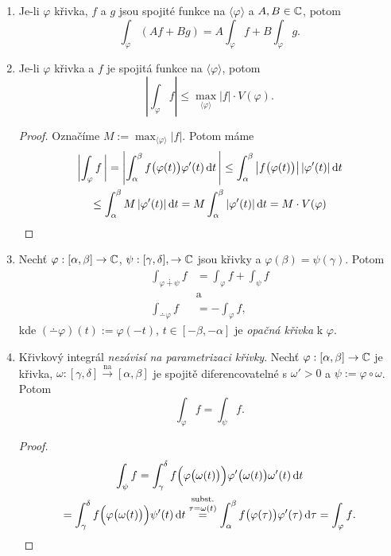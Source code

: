 \begin{propertiesBasic}
\mbox{}
\vspace{-2em}
\begin{enumerate}
    \item Je-li $\varphi$ křivka, $f$ a $g$ jsou spojité funkce na $\langle\varphi\rangle$ a $A,B \in \operatorname{\mathbb{C}}  $, potom $$\int_\varphi (Af+Bg)=A\int_\varphi f+B\int_\varphi g.$$
    \item Je-li $\varphi$ křivka a $f$ je spojitá funkce na $\langle\varphi\rangle$, potom $$\left|\int_\varphi f\right|\leq\max_{\langle\varphi\rangle}|f|\cdot V(\varphi).$$
    \begin{proof}
     Označíme $M:=\max_{\langle\varphi\rangle}|f|$. Potom máme
     \begin{multline*}
     \left|\int_\varphi f\, \right|=
     \left| \int_\alpha^\beta f\bigl(\varphi(t)\bigr) \varphi'(t) \mathop{}\!\mathrm{d} t \, \right|
     \leq\int_\alpha^\beta\left|f\bigl(\varphi(t)\bigr)\right|\left|\varphi'(t)\right|\mathop{}\!\mathrm{d} t\\
     \leq\int_\alpha^\beta M\left|\varphi'(t)\right|\mathop{}\!\mathrm{d} t =M\int_\alpha^\beta \left|\varphi'(t)\right|\mathop{}\!\mathrm{d} t
     = M\cdot V(\varphi)
     \end{multline*}
    \end{proof}
    \item Nechť %
    $\varphi:[\alpha,\beta]\rightarrow\operatorname{\mathbb{C}}  $, $\psi:[\gamma,\delta],\rightarrow\operatorname{\mathbb{C}}  $ jsou křivky a $\varphi(\beta)=\psi(\gamma)$. Potom 
    \begin{align*}
        \int_{\varphi\dotplus\psi}f&=\int_\varphi f+\int_\psi f \\ 
        &\text{a} \\
        \int_{\dotminus \varphi}f&=-\int_\varphi f\text{,}
    \end{align*}
    kde $(\dotminus \varphi)(t):=\varphi(-t)$, $t\in[-\beta,-\alpha]$ je \emph{opačná křivka} k %
    $\varphi$.
    \item Křivkový integrál \emph{nezávisí na parametrizaci křivky}. Nechť $\varphi:[\alpha,\beta]\rightarrow\operatorname{\mathbb{C}}  $ je křivka, $\omega:[\gamma,\delta]\xrightarrow{\text{na}}[\alpha,\beta]$ je spojitě diferencovatelné s $\omega'>0$ a $\psi:=\varphi\circ\omega$. %
    Potom $$\int_\varphi f = \int_\psi f\text{.}$$
    \begin{proof}
    \begin{multline*}
        \int_\psi f=
    \int_\gamma^\delta f\Bigl(\varphi\bigl(\omega(t)\bigr)\Bigr) \varphi'\bigl(\omega(t)\bigr)\omega'(t)\mathop{}\!\mathrm{d} t\\
    =\int_\gamma^\delta f\Bigl(\varphi\bigl(\omega(t)\bigr)\Bigr)\psi'(t)\mathop{}\!\mathrm{d} t \stackrel{\text{subst.}}{\stackrel{\tau=\omega(t)}{=}}
    \int_\alpha^\beta f\bigl(\varphi(\tau)\bigr) \varphi'(\tau)\mathop{}\!\mathrm{d} \tau=\int_\varphi f \text{.} 
    \end{multline*}
    \end{proof}
\end{enumerate}
\end{propertiesBasic}
